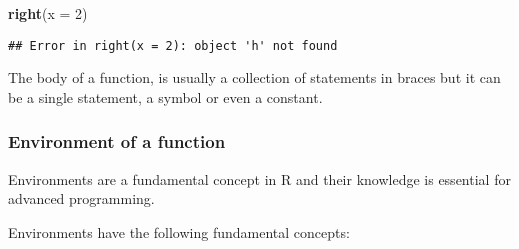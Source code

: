 \documentclass[]{book}
\newenvironment{Shaded}{\begin{snugshade}}{\end{snugshade}}
\newcommand{\KeywordTok}[1]{\textcolor[rgb]{0.13,0.29,0.53}{\textbf{{#1}}}}
\newcommand{\DataTypeTok}[1]{\textcolor[rgb]{0.13,0.29,0.53}{{#1}}}
\newcommand{\DecValTok}[1]{\textcolor[rgb]{0.00,0.00,0.81}{{#1}}}
\newcommand{\NormalTok}[1]{{#1}}
\begin{document}
\begin{Shaded}
\begin{Highlighting}[]
\KeywordTok{right}\NormalTok{(}\DataTypeTok{x =} \DecValTok{2}\NormalTok{)}
\end{Highlighting}
\end{Shaded}

\begin{verbatim}
## Error in right(x = 2): object 'h' not found
\end{verbatim}

The body of a function, is usually a collection of statements in braces
but it can be a single statement, a symbol or even a constant.

\subsubsection{Environment of a
function}\label{environment-of-a-function}

Environments are a fundamental concept in R and their knowledge is
essential for advanced programming.

Environments have the following fundamental concepts:
\end{document}

